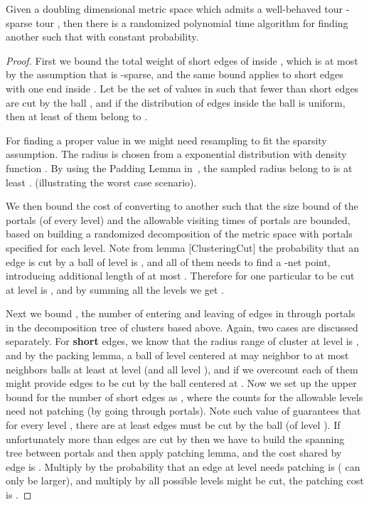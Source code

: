 \documentclass{llncs}
\begin{document}
\begin{lemma}
Given a doubling dimensional metric space  which admits a well-behaved tour -sparse tour , then there is a randomized polynomial time algorithm for finding another  such that  with constant probability.
\end{lemma}
\begin{proof}
First we bound the total weight of short edges of  inside , which is at most  by the assumption that  is -sparse, and the same bound applies to short edges with one end inside .
Let  be the set of values in  such that fewer than  short edges are cut by the ball , and if the distribution of edges inside the ball is uniform, then at least  of them belong to .

For finding a proper value in  we might need resampling to fit the sparsity assumption.
The radius is chosen from a exponential distribution with density function .
By using the Padding Lemma in~\cite{abn11}, the sampled radius belong to  is at least . (illustrating the worst case scenario).

We then bound the cost of converting  to another  such that the size bound of the portals (of every level) and the allowable visiting times of portals are bounded, based on building a randomized decomposition of the metric space with portals specified for each level.
Note from lemma [ClusteringCut] the probability that an edge  is cut by a ball of level  is , and all of them needs to find a -net point, introducing additional length of at most .
Therefore for one particular  to be cut at level is , and by summing all the levels we get .

Next we bound , the number of entering and leaving of edges in  through portals in the decomposition tree of clusters based above. Again, two cases are discussed separately.
For \textbf{short} edges, we know that the radius range of cluster at level  is , and by the packing lemma, a ball of level  centered at  may neighbor to at most  neighbors balls at least at level  (and all level ), and if we overcount each of them might provide  edges to be cut by the ball centered at .
Now we set up the upper bound  for the number of short edges  as , where the  counts for the allowable levels need not patching (by going through portals).
Note such value of  guarantees that for every level , there are at least  edges must be cut by the ball (of level ).
If unfortunately more than  edges are cut by  then we have to build the spanning tree between portals and then apply patching lemma, and the cost shared by edge is .
Multiply by the probability that an edge at level  needs patching is  ( can only be larger), and multiply by all possible  levels  might be cut, the patching cost is .


\end{proof}
\end{document}
